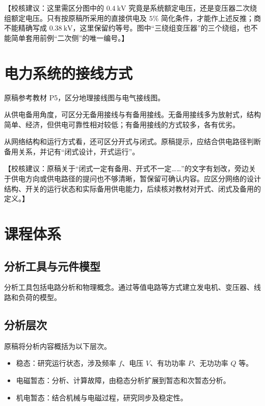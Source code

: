 \documentclass[
  12pt,
  UTF8,
  a4paper,
  fontset=fandol,
  oneside,
  openany
]{ctexrep}
\newcommand{\reviewnote}[1]{%
  \par\smallskip
  {\color{reviewgray}\small\noindent【校核建议：#1】\par}
  \smallskip
}
\begin{document}
\reviewnote{这里需区分图中的 $0.4~\mathrm{kV}$ 究竟是系统额定电压，还是变压器二次绕组额定电压。只有按原稿所采用的直接供电及 $5\%$ 简化条件，才能作上述反推；商不能精确写成 $0.38~\mathrm{kV}$，这里保留约等号。图中“三绕组变压器”的三个绕组，也不能简单套用前例“二次侧”的唯一编号。}

\section{电力系统的接线方式}

原稿参考教材 P5，区分地理接线图与电气接线图。

从供电备用角度，可区分无备用接线与有备用接线。无备用接线多为放射式，结构简单、经济，但供电可靠性相对较低；有备用接线的方式较多，各有优劣。

从网络结构和运行方式看，还可区分开式与闭式。原稿提示，应结合供电路径判断备用关系，并记有“闭式设计，开式运行”。

\reviewnote{原稿关于“闭式一定有备用、开式不一定……”的文字有划改，旁边关于供电方向或供电路径的提问也不够清晰，暂保留可确认内容。应区分网络的设计结构、开关的运行状态和实际备用供电能力，后续核对教材对开式、闭式及备用的定义。}

\section{课程体系}

\subsection{分析工具与元件模型}

分析工具包括电路分析和物理概念。通过等值电路等方式建立发电机、变压器、线路和负荷的模型。

\subsection{分析层次}

原稿将分析内容概括为以下层次。

\begin{itemize}
  \item 稳态：研究运行状态，涉及频率 $f$、电压 $V$、有功功率 $P$、无功功率 $Q$ 等。
  \item 电磁暂态：分析、计算故障，由稳态分析扩展到暂态和次暂态分析。
  \item 机电暂态：结合机械与电磁过程，研究同步及稳定性。
\end{itemize}
\end{document}
